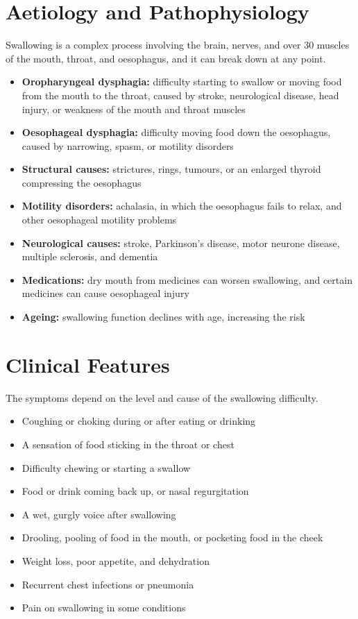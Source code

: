 \section*{Aetiology and Pathophysiology}
Swallowing is a complex process involving the brain, nerves, and over 30 muscles of the mouth, throat, and oesophagus, and it can break down at any point.
\begin{itemize}
    \item \textbf{Oropharyngeal dysphagia:} difficulty starting to swallow or moving food from the mouth to the throat, caused by stroke, neurological disease, head injury, or weakness of the mouth and throat muscles
    \item \textbf{Oesophageal dysphagia:} difficulty moving food down the oesophagus, caused by narrowing, spasm, or motility disorders
    \item \textbf{Structural causes:} strictures, rings, tumours, or an enlarged thyroid compressing the oesophagus
    \item \textbf{Motility disorders:} achalasia, in which the oesophagus fails to relax, and other oesophageal motility problems
    \item \textbf{Neurological causes:} stroke, Parkinson's disease, motor neurone disease, multiple sclerosis, and dementia
    \item \textbf{Medications:} dry mouth from medicines can worsen swallowing, and certain medicines can cause oesophageal injury
    \item \textbf{Ageing:} swallowing function declines with age, increasing the risk
\end{itemize}

\section*{Clinical Features}
The symptoms depend on the level and cause of the swallowing difficulty.
\begin{itemize}
    \item Coughing or choking during or after eating or drinking
    \item A sensation of food sticking in the throat or chest
    \item Difficulty chewing or starting a swallow
    \item Food or drink coming back up, or nasal regurgitation
    \item A wet, gurgly voice after swallowing
    \item Drooling, pooling of food in the mouth, or pocketing food in the cheek
    \item Weight loss, poor appetite, and dehydration
    \item Recurrent chest infections or pneumonia
    \item Pain on swallowing in some conditions
\end{itemize}

